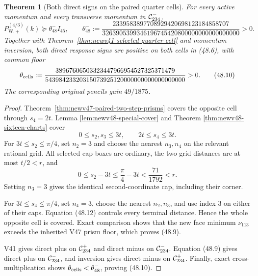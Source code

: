 \documentclass[11pt,oneside]{article}
\newtheorem{theorem}{Theorem}[section]
\theoremstyle{definition}
\theoremstyle{remark}
\begin{document}
\begin{theorem}[Both direct signs on the paired quarter cells]
\label{thm:newv48-paired-quarter-cells}
For every active momentum and every transverse momentum in
\({\cal C}_{234}^{-}\),
\[
 P_{\mathrm W,+}^{(4/3)}(k)
 \succeq\theta_{48}^{-}I_{45},\qquad
 \theta_{48}^{-}:=
 \frac{2339583897708929420698123184858707}
 {3263905399346196745420800000000000000000}>0.         \tag{48.9}
\]
Together with Theorem~\ref{thm:newv41-selected-quarter-cell} and
momentum inversion, both direct response signs are positive on
both cells in (48.6), with common floor
\[
 \theta_{\rm cells}:=
 \frac{38967606503323447966954527325371479}
 {54398423320315073925120000000000000000000}>0.        \tag{48.10}
\]
The corresponding original pencils gain \(49/1875\).
\end{theorem}

\begin{proof}
Theorem~\ref{thm:newv47-paired-two-step-prisms} covers the
opposite cell through \(s_4=2t\).  Lemma
\ref{lem:newv48-special-cover} and Theorem
\ref{thm:newv48-sixteen-charts} cover
\[
 0\le s_2,s_3\le3t,\qquad2t\le s_4\le3t.              \tag{48.11}
\]
For \(3t\le s_2\le\pi/4\), set \(n_2=3\) and choose the
nearest \(n_3,n_4\) on the relevant rational grid.  All selected
cap boxes are ordinary, the two grid distances are at most
\(t/2<r\), and
\[
 0\le s_2-3t\le\frac{\pi}{4}-3t
 <\frac{71}{1792}<r.                                  \tag{48.12}
\]
Setting \(n_3=3\) gives the identical second-coordinate cap,
including their corner.

For \(3t\le s_4\le\pi/4\), set \(n_4=3\), choose the nearest
\(n_2,n_3\), and use index \(3\) on either of their caps.
Equation (48.12) controls every terminal distance.  Hence the whole
opposite cell is covered.  Exact comparison shows that the new
face minimum \(\nu_{113}\) exceeds the inherited V47 prism floor,
which proves (48.9).

V41 gives direct plus on \({\cal C}_{234}^{+}\) and direct minus
on \({\cal C}_{234}^{-}\).  Equation (48.9) gives direct plus on
\({\cal C}_{234}^{-}\), and inversion gives direct minus on
\({\cal C}_{234}^{+}\).  Finally, exact cross-multiplication shows
\(\theta_{\rm cells}<\theta_{48}^{-}\), proving (48.10).
\end{proof}
\end{document}

